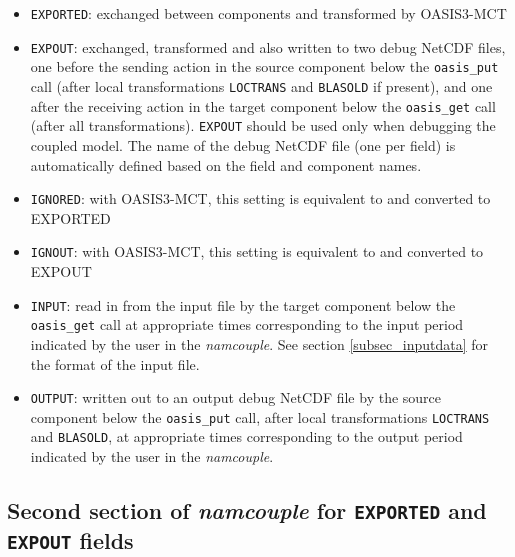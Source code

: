 \begin{itemize}
\item {\tt EXPORTED}: exchanged between components and
  transformed by OASIS3-MCT
\item {\tt EXPOUT}: exchanged, transformed and also written to two
  debug NetCDF files, one before the sending action in the source
  component below the {\tt oasis\_put} call (after local transformations
  {\tt LOCTRANS} and {\tt BLASOLD} if present), and one after the
  receiving action in the target component below the {\tt oasis\_get} call
  (after all transformations). {\tt EXPOUT} should be used only when
  debugging the coupled model. The name of the debug NetCDF file
  (one per field) is automatically defined based on the field and
  component names.
\item {\tt IGNORED}: with OASIS3-MCT, this setting is equivalent to
  and converted to EXPORTED
\item {\tt IGNOUT}: with OASIS3-MCT, this setting is equivalent to and
  converted to EXPOUT
\item {\tt INPUT}: read in from the input file by the target component
  below the {\tt oasis\_get} call at
  appropriate times corresponding to the input period indicated by the
  user in the {\it namcouple}. See section \ref{subsec_inputdata} for
  the format of the input file.
\item {\tt OUTPUT}: written out to an output debug NetCDF file by the
  source component below the {\tt oasis\_put} call, after local
  transformations {\tt LOCTRANS} and {\tt BLASOLD}, at appropriate
  times corresponding to the output period indicated by the user in
  the {\it namcouple}.

\end{itemize}

\subsection{Second section of {\it namcouple} for {\tt EXPORTED} and
  {\tt EXPOUT} fields}
\label{subsubsec_secondEXPORTED}

